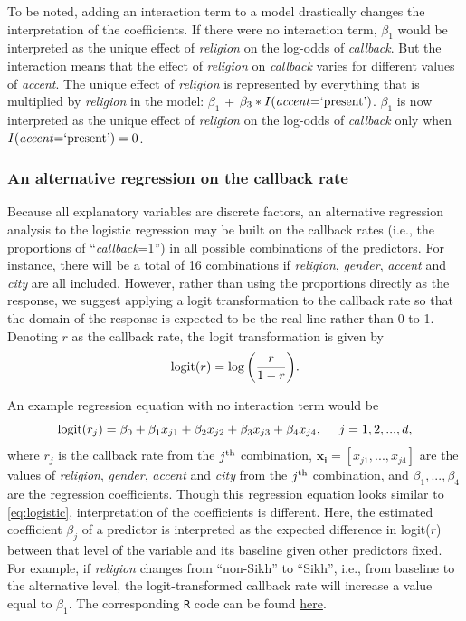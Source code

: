 \documentclass[11pt]{article}
\begin{document}
To be noted, adding an interaction term to a model drastically changes the interpretation of the coefficients. If there were no interaction term, $\beta_1$ would be interpreted as the unique effect of \textit{religion} on the log-odds of \textit{callback}. But the interaction means that the effect of \textit{religion} on \textit{callback} varies for different values of \textit{accent}. The unique effect of \textit{religion} is represented by everything that is multiplied by \textit{religion} in the model: $\beta_1$ + $\beta_3*I\textnormal{(\textit{accent}=`present')}$. $\beta_1$ is now interpreted as the unique effect of \textit{religion} on the log-odds of \textit{callback} only when $I\textnormal{(\textit{accent}=`present')}=0$.


\subsubsection{An alternative regression on the callback rate}

Because all explanatory variables are discrete factors, an alternative regression analysis to the logistic regression may be built on the callback rates (i.e., the proportions of ``\textit{callback}=1'') in all possible combinations of the predictors. For instance, there will be a total of 16 combinations if \textit{religion}, \textit{gender}, \textit{accent}  and \textit{city} are all included. However, rather than using the proportions directly as the response, we suggest applying a logit transformation to the callback rate so that the domain of the response is expected to be the real line rather than 0 to 1. Denoting $r$ as the callback rate, the logit transformation is given by
\begin{equation}
    \textnormal{logit}(r) = \log \bigg(\frac{r}{1-r}\bigg).
\end{equation}

An example regression equation with no interaction term would be
\begin{equation}
    \textnormal{logit}(r_j) = \beta_0 + \beta_1x_{j1} + \beta_2x_{j2} + \beta_3x_{j3} + \beta_4x_{j4},\ \ \ \ j=1,2,...,d,
\end{equation}
where $r_j$ is the callback rate from the $j^\textnormal{th}$ combination,  $\mathbf{x_i} = [x_{j1},...,x_{j4}]$ are the values of \textit{religion}, \textit{gender}, \textit{accent}  and \textit{city} from the $j^\textnormal{th}$ combination, and $\beta_1, ..., \beta_4$ are the regression coefficients. Though this regression equation looks similar to \autoref{eq:logistic}, interpretation of the coefficients is different. Here, the estimated coefficient $\beta_j$ of a predictor is interpreted as the expected difference in logit($r$) between that level of the variable and its baseline given other predictors fixed. For example, if \textit{religion} changes from ``non-Sikh'' to ``Sikh'', i.e., from baseline to the alternative level, the logit-transformed callback rate will increase a value equal to $\beta_1$. The corresponding \texttt{R} code can be found \href{https://github.com/NingShen1997/STAT551_Case34/blob/main/Code/alternative_regression.R}{here}.
\end{document}
